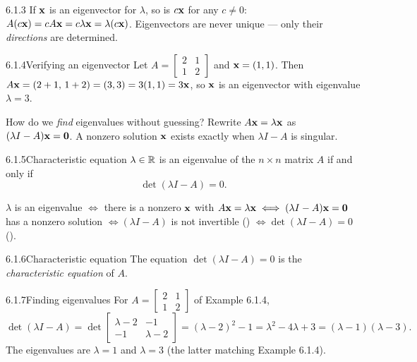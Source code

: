 \begin{rmks}{6.1.3}
If $\mathbf{x}$ is an eigenvector for $\lambda$, so is $c\mathbf{x}$ for any $c\neq0$: $A(c\mathbf{x})=cA\mathbf{x}=c\lambda\mathbf{x}=\lambda(c\mathbf{x})$. Eigenvectors are never unique --- only their \emph{directions} are determined.
\end{rmks}

\begin{exmp}{6.1.4}{Verifying an eigenvector}
Let $A=\left[\begin{smallmatrix}2&1\\1&2\end{smallmatrix}\right]$ and $\mathbf{x}=(1,1)$. Then $A\mathbf{x}=(2+1,\,1+2)=(3,3)=3(1,1)=3\mathbf{x}$, so $\mathbf{x}$ is an eigenvector with eigenvalue $\lambda=3$.
\end{exmp}

How do we \emph{find} eigenvalues without guessing? Rewrite $A\mathbf{x}=\lambda\mathbf{x}$ as $(\lambda I-A)\mathbf{x}=\mathbf{0}$. A nonzero solution $\mathbf{x}$ exists exactly when $\lambda I-A$ is singular.

\begin{thms}{6.1.5}{Characteristic equation}
$\lambda\in\mathbb{R}$ is an eigenvalue of the $n\times n$ matrix $A$ if and only if
\[
\det(\lambda I-A)=0.
\]
\end{thms}

\begin{prf}
$\lambda$ is an eigenvalue $\iff$ there is a nonzero $\mathbf{x}$ with $A\mathbf{x}=\lambda\mathbf{x}\iff(\lambda I-A)\mathbf{x}=\mathbf{0}$ has a nonzero solution $\iff(\lambda I-A)$ is not invertible () $\iff\det(\lambda I-A)=0$ ().
\end{prf}

\begin{defns}{6.1.6}{Characteristic equation}
The equation $\det(\lambda I-A)=0$ is the \emph{characteristic equation} of $A$.
\end{defns}

\begin{exmp}{6.1.7}{Finding eigenvalues}
For $A=\left[\begin{smallmatrix}2&1\\1&2\end{smallmatrix}\right]$ of Example 6.1.4,
\[
\det(\lambda I-A)=\det\!\begin{bmatrix}\lambda-2&-1\\-1&\lambda-2\end{bmatrix}=(\lambda-2)^2-1=\lambda^2-4\lambda+3=(\lambda-1)(\lambda-3).
\]
The eigenvalues are $\lambda=1$ and $\lambda=3$ (the latter matching Example 6.1.4).
\end{exmp}

